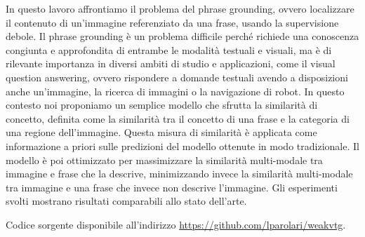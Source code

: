 
In questo lavoro affrontiamo il problema del phrase grounding, ovvero
localizzare il contenuto di un'immagine referenziato da una frase,
usando la supervisione debole. Il phrase grounding è un problema
difficile perché richiede una conoscenza congiunta e approfondita di
entrambe le modalità testuali e visuali, ma è di rilevante importanza
in diversi ambiti di studio e applicazioni, come il visual question
answering, ovvero rispondere a domande testuali avendo a disposizioni
anche un'immagine, la ricerca di immagini o la navigazione di robot.
In questo contesto noi proponiamo un semplice modello che sfrutta la
similarità di concetto, definita come la similarità tra il concetto di
una frase e la categoria di una regione dell'immagine. Questa misura
di similarità è applicata come informazione a priori sulle predizioni
del modello ottenute in modo tradizionale. Il modello è poi
ottimizzato per massimizzare la similarità multi-modale tra immagine e
frase che la descrive, minimizzando invece la similarità multi-modale
tra immagine e una frase che invece non descrive l'immagine. Gli
esperimenti svolti mostrano risultati comparabili allo stato
dell'arte.

Codice sorgente disponibile all'indirizzo
\href{https://github.com/lparolari/weakvtg}{https://github.com/lparolari/weakvtg}.
